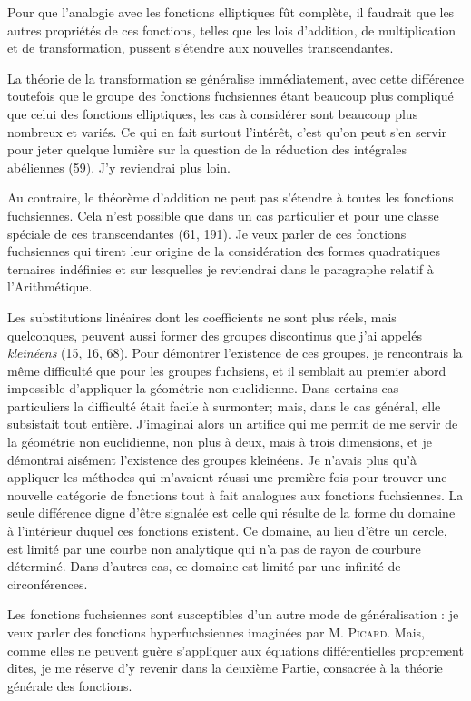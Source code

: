 \documentclass[11pt]{article}
\begin{document}
Pour que l’analogie avec les fonctions elliptiques fût complète, il faudrait que les autres propriétés de ces fonctions, telles que les lois d’addition, de multiplication et de transformation, pussent s’étendre aux nouvelles transcendantes.

La théorie de la transformation se généralise immédiatement, avec cette différence toutefois que le groupe des fonctions fuchsiennes étant beaucoup plus compliqué que celui des fonctions elliptiques, les cas à considérer sont beaucoup plus nombreux et variés. Ce qui en fait surtout l’intérêt, c’est qu’on peut s’en servir pour jeter quelque lumière sur la question de la réduction des intégrales abéliennes (59). J’y reviendrai plus loin.

Au contraire, le théorème d’addition ne peut pas s’étendre à toutes les fonctions fuchsiennes. Cela n’est possible que dans un cas particulier et pour une classe spéciale de ces transcendantes (61, 191). Je veux parler de ces fonctions fuchsiennes qui tirent leur origine de la considération des formes quadratiques ternaires indéfinies et sur lesquelles je reviendrai dans le paragraphe relatif à l’Arithmétique.

Les substitutions linéaires dont les coefficients ne sont plus réels, mais quelconques, peuvent aussi former des groupes discontinus que j’ai appelés \emph{kleinéens} (15, 16, 68). Pour démontrer l’existence de ces groupes, je rencontrais la même difficulté que pour les groupes fuchsiens, et il semblait au premier abord impossible d’appliquer la géométrie non euclidienne. Dans certains cas particuliers la difficulté était facile à surmonter; mais, dans le cas général, elle subsistait tout entière. J’imaginai alors un artifice qui me permit de me servir de la géométrie non euclidienne, non plus à deux, mais à trois dimensions, et je démontrai aisément l’existence des groupes kleinéens. Je n’avais plus qu’à appliquer les méthodes qui m’avaient réussi une première fois pour trouver une nouvelle catégorie de fonctions tout à fait analogues aux fonctions fuchsiennes. La seule différence digne d’être signalée est celle qui résulte de la forme du domaine à l’intérieur duquel ces fonctions existent. Ce domaine, au lieu d’être un cercle, est limité par une courbe non analytique qui n’a pas de rayon de courbure déterminé. Dans d’autres cas, ce domaine est limité par une infinité de circonférences.

Les fonctions fuchsiennes sont susceptibles d’un autre mode de généralisation : je veux parler des fonctions hyperfuchsiennes imaginées par M. \textsc{Picard}. Mais, comme elles ne peuvent guère s’appliquer aux équations différentielles proprement dites, je me réserve d’y revenir dans la deuxième Partie, consacrée à la théorie générale des fonctions.
\end{document}
